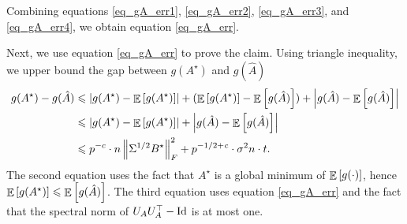 	Combining equations \eqref{eq_gA_err1}, \eqref{eq_gA_err2}, \eqref{eq_gA_err3}, and \eqref{eq_gA_err4}, we obtain equation \eqref{eq_gA_err}.

	\bigskip
	Next, we use equation \eqref{eq_gA_err} to prove the claim.
	Using triangle inequality, we upper bound the gap between $g(A^{\star})$ and $g(\hat{A})$
	\begin{align}
		g(A^{\star}) - g(\hat{A}) &\leqslant {\left| {g(A^{\star}) - \mathop{\mathbb{E}}\left[ g(A^{\star}) \right]} \right|} + (\mathop{\mathbb{E}}\left[ g(A^{\star}) \right] - \mathop{\mathbb{E}}\left[ g(\hat{A}) \right]) + {\left| {g(\hat{A}) - \mathop{\mathbb{E}}\left[ g(\hat{A}) \right]} \right|} \nonumber \\
		&\leqslant {\left| {g(A^{\star}) - \mathop{\mathbb{E}}\left[ g(A^{\star}) \right]} \right|} +{\left| {g(\hat{A}) - \mathop{\mathbb{E}}\left[ g(\hat{A}) \right]} \right|} \nonumber \\
		&\leqslant p^{-c} \cdot n \left\| \Sigma^{1/2} B^{\star} \right\|_{F}^2 + p^{-1/2 + {\mathit{c}}}\cdot \sigma^2 n \cdot t. \label{eq_g_gap}
	\end{align}
	The second equation uses the fact that $A^{\star}$ is a global minimum of $\mathop{\mathbb{E}}\left[ g(\cdot) \right]$, hence $\mathop{\mathbb{E}}\left[ g(A^{\star}) \right] \leqslant \mathop{\mathbb{E}}\left[ g(\hat{A}) \right]$.
	The third equation uses equation \eqref{eq_gA_err} and the fact that the spectral norm of $U_A U_A^{\top} - \operatorname{Id}$ is at most one.

